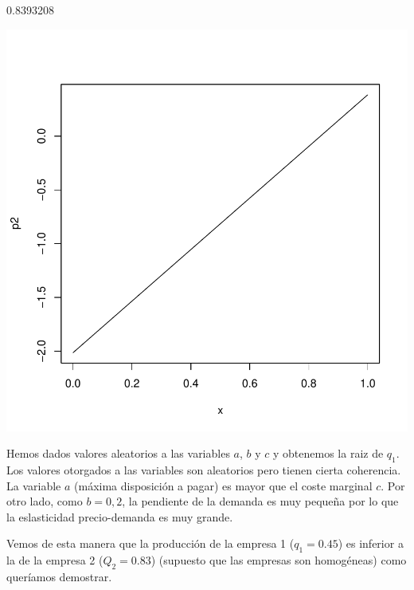 \documentclass{article}
\begin{document}
\begin{Schunk}
\begin{Soutput}
[1] 0.8393208
\end{Soutput}
\end{Schunk}
\includegraphics{PUTAPRUEBA-004}



Hemos dados valores aleatorios a las variables $a$, $b$ y $c$ y obtenemos la raiz de $q_1$. Los valores otorgados a las variables son aleatorios pero tienen cierta coherencia. La variable $a$ (m\'axima disposici\'on a pagar) es mayor que el coste marginal $c$. Por otro lado, como $b=0,2$, la pendiente de la demanda es muy pequeña por lo que la eslasticidad precio-demanda es muy grande.

Vemos de esta manera que la producci\'on de la empresa 1 ($q_1=0.45$) es inferior a la de la empresa 2 ($Q_2=0.83$) (supuesto que las empresas son homog\'eneas) como quer\'iamos demostrar.
\end{document}
